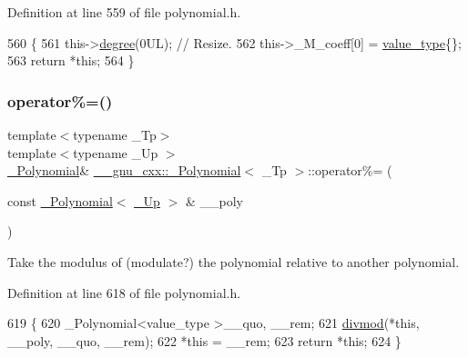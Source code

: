 Definition at line 559 of file polynomial.\+h.


\begin{DoxyCode}
560         \{
561           this->\hyperlink{class____gnu__cxx_1_1__Polynomial_a07d9933aeeb9afbd823218ed921336cb}{degree}(0UL); \textcolor{comment}{// Resize.}
562           this->\_M\_coeff[0] = \hyperlink{class____gnu__cxx_1_1__Polynomial_a725563351f50e76084a7a016c06f8a53}{value\_type}\{\};
563           \textcolor{keywordflow}{return} *\textcolor{keyword}{this};
564         \}
\end{DoxyCode}
\mbox{\label{class____gnu__cxx_1_1__Polynomial_a66661e25c272a310f7bf1abbcc8fa2a9}} 
\subsubsection{\texorpdfstring{operator\%=()}{operator\%=()}\hspace{0.1cm}{\footnotesize\ttfamily [2/2]}}
{\footnotesize\ttfamily template$<$typename \+\_\+\+Tp$>$ \\
template$<$typename \+\_\+\+Up $>$ \\
\hyperlink{class____gnu__cxx_1_1__Polynomial}{\+\_\+\+Polynomial}\& \hyperlink{class____gnu__cxx_1_1__Polynomial}{\+\_\+\+\_\+gnu\+\_\+cxx\+::\+\_\+\+Polynomial}$<$ \+\_\+\+Tp $>$\+::operator\%= (\begin{DoxyParamCaption}\item[{const \hyperlink{class____gnu__cxx_1_1__Polynomial}{\+\_\+\+Polynomial}$<$ \hyperlink{class____gnu__cxx_1_1__Polynomial_a242114d4b86648a5dff67a8221f80d40}{\+\_\+\+Up} $>$ \&}]{\+\_\+\+\_\+poly }\end{DoxyParamCaption})\hspace{0.3cm}{\ttfamily [inline]}}

Take the modulus of (modulate?) the polynomial relative to another polynomial. 

Definition at line 618 of file polynomial.\+h.


\begin{DoxyCode}
619         \{
620           \_Polynomial<value\_type >\_\_quo, \_\_rem;
621           \hyperlink{namespace____gnu__cxx_a84c52dc7c40b8b2731425e93db52903d}{divmod}(*\textcolor{keyword}{this}, \_\_poly, \_\_quo, \_\_rem);
622           *\textcolor{keyword}{this} = \_\_rem;
623           \textcolor{keywordflow}{return} *\textcolor{keyword}{this};
624         \}
\end{DoxyCode}
\mbox{\label{class____gnu__cxx_1_1__Polynomial_af744b14b94fd7dbb579b8902b8609258}} 
